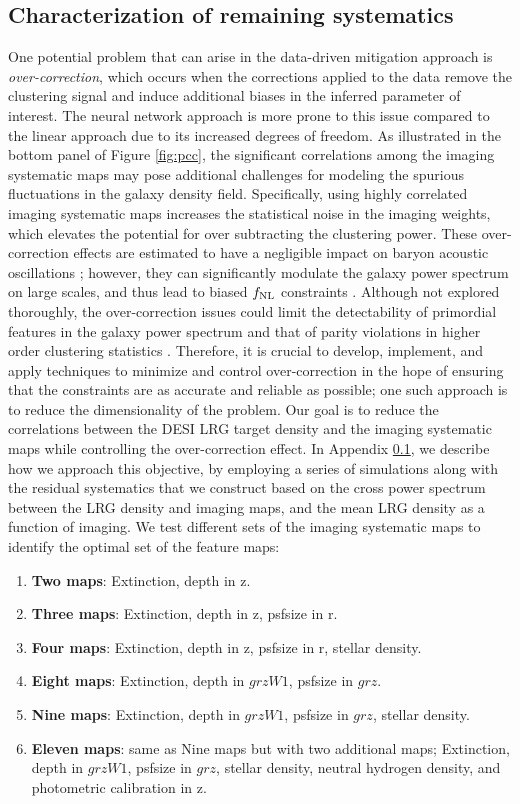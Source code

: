 \subsection{Characterization of remaining systematics}\label{sec:systests}
\label{ssec:characterization}
One potential problem that can arise in the data-driven mitigation approach is \textit{over-correction}, which occurs when the corrections applied to the data remove the clustering signal and induce additional biases in the inferred parameter of interest. The neural network approach is more prone to this issue compared to the linear approach due to its increased degrees of freedom. As illustrated in the bottom panel of Figure \ref{fig:pcc}, the significant correlations among the imaging systematic maps may pose additional challenges for modeling the spurious fluctuations in the galaxy density field. Specifically, using highly correlated imaging systematic maps increases the statistical noise in the imaging weights, which elevates the potential for over subtracting the clustering power. These over-correction effects are estimated to have a negligible impact on baryon acoustic oscillations \citep{merz2021clustering}; however, they can significantly modulate the galaxy power spectrum on large scales, and thus lead to biased $f_{\rm NL}$ constraints \citep{rezaie2021primordial, mueller2022primordial}. Although not explored thoroughly, the over-correction issues could limit the detectability of primordial features in the galaxy power spectrum and that of parity violations in higher order clustering statistics \citep{beutler2019primordial, cahn2021test, philcox2022probing}. Therefore, it is crucial to develop, implement, and apply techniques to minimize and control over-correction in the hope of ensuring that the constraints are as accurate and reliable as possible; one such approach is to reduce the dimensionality of the problem. Our goal is to reduce the correlations between the DESI LRG target density and the imaging systematic maps while controlling the over-correction effect. In Appendix \ref{sec:systests}, we describe how we approach this objective, by employing a series of simulations along with the residual systematics that we construct based on the cross power spectrum between the LRG density and imaging maps, and the mean LRG density as a function of imaging. We test different sets of the imaging systematic maps to identify the optimal set of the feature maps:
\begin{enumerate}[itemindent=*]
\item \textbf{Two maps}: Extinction, depth in z.
\item \textbf{Three maps}: Extinction, depth in z, psfsize in r.
\item \textbf{Four maps}: Extinction, depth in z, psfsize in r, stellar density.
\item \textbf{Eight maps}: Extinction, depth in $grzW1$, psfsize in $grz$.
\item \textbf{Nine maps}: Extinction, depth in $grzW1$, psfsize in $grz$, stellar density.
\item \textbf{Eleven maps}: same as Nine maps but with two additional maps; Extinction, depth in $grzW1$, psfsize in $grz$, stellar density, neutral hydrogen density, and photometric calibration in z.
\end{enumerate}
